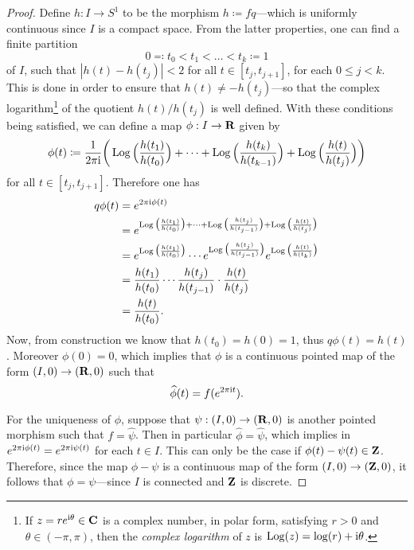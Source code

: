 \begin{proof}
Define \(h: I \to S^1\) to be the morphism \(h \coloneq f q\)---which is
uniformly continuous since \(I\) is a compact space. From the latter properties,
one  can find a finite partition
\[
0 \eqqcolon t_0 < t_1 < \dots < t_k \coloneq 1
\]
of \(I\), such that \(|h(t) - h(t_j)| < 2\) for all \(t \in [t_j, t_{j+1}]\),
for each \(0 \leq j < k\). This is done in order to ensure that
\(h(t) \neq -h(t_j)\)---so that the complex logarithm\footnote{ If
  \(z = r e^{\text{i} \theta} \in \mathbf{C}\) is a complex number, in polar form,
  satisfying \(r > 0\) and \(\theta \in (-\pi, \pi)\), then the \emph{complex
  logarithm} of \(z\) is \(\operatorname{Log}(z) = \log(r) + \text{i} \theta\).
} of the quotient \(h(t)/h(t_j)\) is
well defined. With these conditions being satisfied, we can define a map
\(\phi: I \to \mathbf{R}\) given by
\[
\phi(t) \coloneq
\frac{1}{2 \pi \text{i}} \bigg(
  \operatorname{Log}\Big( \frac{h(t_1)}{h(t_0)} \Big)
  + \dots
  + \operatorname{Log}\Big( \frac{h(t_k)}{h(t_{k-1})} \Big)
  + \operatorname{Log}\Big( \frac{h(t)}{h(t_j)} \Big)
\bigg)
\]
for all \(t \in [t_j, t_{j+1}]\). Therefore one has
\begin{align*}
q \phi(t)
&= e^{2 \pi \text{i} \phi(t)}
\\
&= e^{
  \operatorname{Log}\big( \frac{h(t_1)}{h(t_0)} \big)
  + \dots
  + \operatorname{Log}\big( \frac{h(t_j)}{h(t_{j-1})} \big)
  + \operatorname{Log}\big( \frac{h(t)}{h(t_j)} \big)
  }
\\
&= e^{\operatorname{Log}\big( \frac{h(t_1)}{h(t_0)} \big)}
  \cdots
  e^{\operatorname{Log}\big( \frac{h(t_j)}{h(t_{j-1})} \big)}
  e^{\operatorname{Log}\big( \frac{h(t)}{h(t_k)} \big)}
\\
&= \frac{h(t_{1})}{h(t_0)} \cdots
  \frac{h(t_{j})}{h(t_{j-1})}
  \cdot
  \frac{h(t)}{h(t_j)}
\\
&= \frac{h(t)}{h(t_0)}.
\end{align*}
Now, from construction we know that \(h(t_0) = h(0) = 1\), thus
\(q \phi(t) = h(t)\). Moreover \(\phi(0) = 0\), which implies that \(\phi\) is a
continuous pointed map of the form \((I, 0) \to (\mathbf{R}, 0)\) such that
\[
\widehat \phi(t) = f(e^{2 \pi \text{i} t}).
\]

For the uniqueness of \(\phi\), suppose that \(\psi: (I, 0) \to (\mathbf{R}, 0)\) is
another pointed morphism such that \(f = \widehat \psi\). Then in particular
\(\widehat \phi = \widehat \psi\), which implies in
\(e^{2 \pi \text{i} \phi(t)} = e^{2 \pi \text{i} \psi(t)}\) for each \(t \in I\). This can
only be the case if \(\phi(t) - \psi(t) \in \mathbf{Z}\). Therefore, since the map
\(\phi - \psi\) is a continuous map of the form \((I, 0) \to (\mathbf{Z}, 0)\), it
follows that \(\phi = \psi\)---since \(I\) is connected and \(\mathbf{Z}\) is discrete.
\end{proof}

